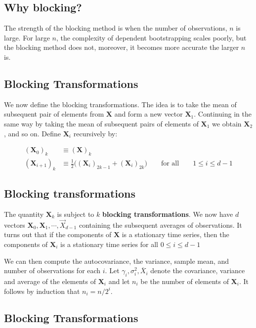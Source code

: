 \documentclass[%
oneside,                 %
final,                   %
10pt]{article}
\begin{document}
\subsection*{Why blocking?}

The strength of the blocking method is when the number of
observations, $n$ is large. For large $n$, the complexity of dependent
bootstrapping scales poorly, but the blocking method does not,
moreover, it becomes more accurate the larger $n$ is.

\subsection*{Blocking Transformations}
 We now define the blocking transformations. The idea is to take the mean of subsequent
pair of elements from $\bm{X}$ and form a new vector
$\bm{X}_1$. Continuing in the same way by taking the mean of
subsequent pairs of elements of $\bm{X}_1$ we obtain $\bm{X}_2$, and
so on. 
Define $\bm{X}_i$ recursively by:

\begin{align} 
(\bm{X}_0)_k &\equiv (\bm{X})_k \nonumber \\
(\bm{X}_{i+1})_k &\equiv \frac{1}{2}\Big( (\bm{X}_i)_{2k-1} +
(\bm{X}_i)_{2k} \Big) \qquad \text{for all} \qquad 1 \leq i \leq d-1
\end{align} 

\subsection*{Blocking transformations}

The quantity $\bm{X}_k$ is
subject to $k$ \textbf{blocking transformations}.  We now have $d$ vectors
$\bm{X}_0, \bm{X}_1,\cdots,\vec X_{d-1}$ containing the subsequent
averages of observations. It turns out that if the components of
$\bm{X}$ is a stationary time series, then the components of
$\bm{X}_i$ is a stationary time series for all $0 \leq i \leq d-1$

We can then compute the autocovariance, the variance, sample mean, and
number of observations for each $i$. 
Let $\gamma_i, \sigma_i^2,
\overline{X}_i$ denote the covariance, variance and average of the
elements of $\bm{X}_i$ and let $n_i$ be the number of elements of
$\bm{X}_i$. It follows by induction that $n_i = n/2^i$. 

\subsection*{Blocking Transformations}
\end{document}
